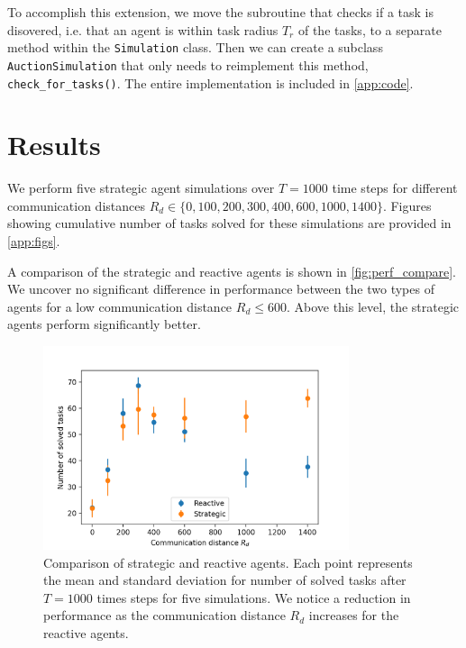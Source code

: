 \documentclass[11pt]{article}
\begin{document}
        To accomplish this extension, we move the subroutine that checks if a task is 
        disovered, i.e. that an agent is within task radius $T_r$ of the tasks, to a
        separate method within the \lstinline|Simulation| class. Then we can 
        create a subclass \lstinline|AuctionSimulation| that only needs to 
        reimplement this method, \lstinline|check_for_tasks()|. The entire implementation is 
        included in \autoref{app:code}.

    \section{Results}

        We perform five strategic agent simulations over $T=1000$ time steps for 
        different communication distances $R_d\in\{0, 100, 200, 300, 400, 600, 1000, 1400\}$.
        Figures showing cumulative number of tasks solved for these simulations are 
        provided in \autoref{app:figs}.

        A comparison of the strategic and reactive agents is shown in \autoref{fig:perf_compare}.
        We uncover no significant difference in performance between the two types of 
        agents for a low communication distance $R_d\leq600$. Above this level, the strategic
        agents perform significantly better.

        \begin{figure}
            \centering
            \includegraphics[width=0.8\textwidth]{figures/perf_compare.png}
            \caption{
                Comparison of strategic and reactive agents. Each point represents 
                the mean and standard deviation for number of solved tasks
                after $T=1000$ times steps for 
                five simulations. We notice a reduction in performance as the 
                communication distance $R_d$ increases for the reactive agents.
                \label{fig:perf_compare} 
            }
        \end{figure}
\end{document}
